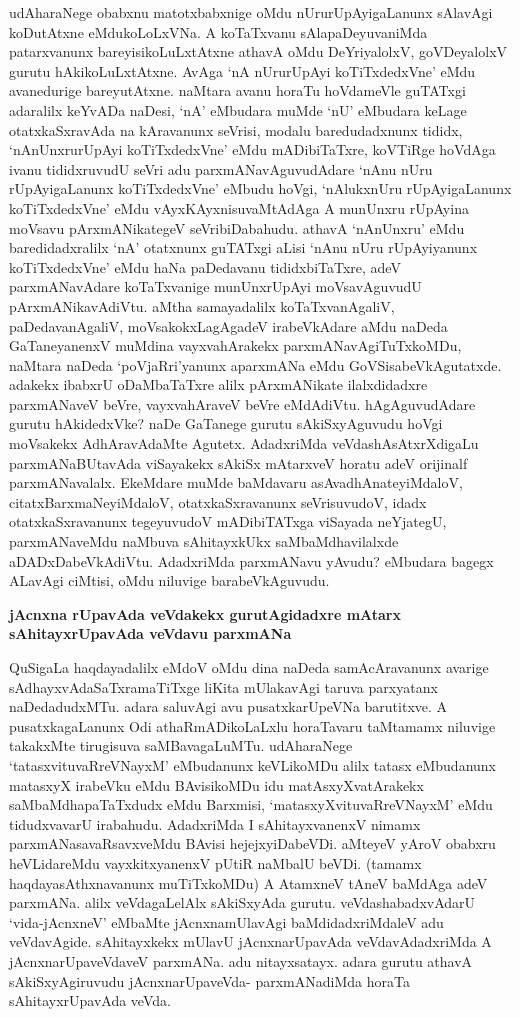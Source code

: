 udAharaNege obabxnu matotxbabxnige oMdu nUrurUpAyigaLanunx sAlavAgi koDutAtxne eMdukoLoLxVNa. A koTaTxvanu sAlapaDeyuvaniMda patarxvanunx bareyisikoLuLxtAtxne athavA oMdu DeYriyalolxV, goVDeyalolxV gurutu hAkikoLuLxtAtxne. AvAga `nA nUrurUpAyi koTiTxdedxVne' eMdu avanedurige bareyutAtxne. naMtara avanu horaTu hoVdameVle guTATxgi adaralilx keYvADa naDesi, `nA' eMbudara muMde `nU' eMbudara keLage otatxkaSxravAda na kAravanunx seVrisi, modalu baredudadxnunx tididx, `nAnUnxrurUpAyi koTiTxdedxVne' eMdu mADibiTaTxre, koVTiRge hoVdAga ivanu tididxruvudU seVri adu parxmANavAguvudAdare `nAnu nUru rUpAyigaLanunx koTiTxdedxVne' eMbudu hoVgi, `nAlukxnUru rUpAyigaLanunx koTiTxdedxVne' eMdu vAyxKAyxnisuvaMtAdAga A munUnxru rUpAyina moVsavu pArxmANikategeV seVribiDabahudu. athavA `nAnUnxru' eMdu baredidadxralilx `nA' otatxnunx guTATxgi aLisi `nAnu nUru rUpAyiyanunx koTiTxdedxVne' eMdu haNa paDedavanu tididxbiTaTxre, adeV parxmANavAdare koTaTxvanige munUnxrUpAyi moVsavAguvudU pArxmANikavAdiVtu. aMtha samayadalilx koTaTxvanAgaliV, paDedavanAgaliV, moVsakokxLagAgadeV irabeVkAdare aMdu naDeda GaTaneyanenxV muMdina vayxvahArakekx parxmANavAgiTuTxkoMDu, naMtara naDeda `poVjaRri'yanunx aparxmANa eMdu GoVSisabeVkAgutatxde. adakekx ibabxrU oDaMbaTaTxre alilx pArxmANikate ilalxdidadxre parxmANaveV beVre, vayxvahAraveV beVre eMdAdiVtu. hAgAguvudAdare gurutu hAkidedxVke? naDe GaTanege gurutu sAkiSxyAguvudu hoVgi moVsakekx AdhAravAdaMte Agutetx. AdadxriMda veVdashAsAtxrXdigaLu parxmANaBUtavAda viSayakekx sAkiSx mAtarxveV horatu adeV orijinalf parxmANavalalx. EkeMdare muMde baMdavaru asAvadhAnateyiMdaloV, citatxBarxmaNeyiMdaloV, otatxkaSxravanunx seVrisuvudoV, idadx otatxkaSxravanunx tegeyuvudoV mADibiTATxga viSayada neYjategU, parxmANaveMdu naMbuva sAhitayxkUkx saMbaMdhavilalxde aDADxDabeVkAdiVtu. AdadxriMda parxmANavu yAvudu? eMbudara bagegx ALavAgi ciMtisi, oMdu niluvige barabeVkAguvudu.

\noindent
{\bf\large{jAcnxna rUpavAda veVdakekx gurutAgidadxre mAtarx sAhitayxrUpavAda veVdavu parxmANa}}\label{page137}

QuSigaLa haqdayadalilx eMdoV oMdu dina naDeda samAcAravanunx avarige sAdhayxvAdaSaTxramaTiTxge liKita mUlakavAgi taruva parxyatanx naDedadudxMTu. adara saluvAgi avu pusatxkarUpeVNa barutitxve. A pusatxkagaLanunx Odi athaRmADikoLaLxlu horaTavaru taMtamamx niluvige takakxMte tirugisuva saMBavagaLuMTu. udAharaNege `tatasxvituvaRreVNayxM' eMbudanunx keVLikoMDu alilx tatasx eMbudanunx matasxyX irabeVku eMdu BAvisikoMDu idu matAsxyXvatArakekx saMbaMdhapaTaTxdudx eMdu Barxmisi, `matasxyXvituvaRreVNayxM' eMdu tidudxvavarU irabahudu. AdadxriMda I sAhitayxvanenxV nimamx parxmANasavaRsavxveMdu BAvisi hejejxyiDabeVDi. aMteyeV yAroV obabxru heVLidareMdu vayxkitxyanenxV pUtiR naMbalU beVDi. (tamamx haqdayasAthxnavanunx muTiTxkoMDu) A AtamxneV tAneV baMdAga adeV parxmANa. alilx veVdagaLelAlx sAkiSxyAda gurutu. veVdashabadxvAdarU `vida-jAcnxneV' eMbaMte jAcnxnamUlavAgi baMdidadxriMdaleV adu veVdavAgide. sAhitayxkekx mUlavU jAcnxnarUpavAda veVdavAdadxriMda A jAcnxnarUpaveVdaveV parxmANa. adu nitayxsatayx. adara gurutu athavA sAkiSxyAgiruvudu jAcnxnarUpaveVda- parxmANadiMda horaTa sAhitayxrUpavAda veVda.

